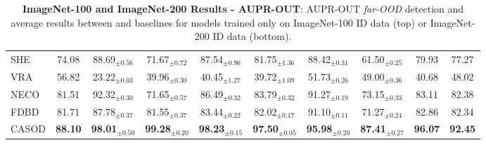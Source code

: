 \begin{table}[t!]
{\begin{tabular}{|l|c|cccccc|c|c|}
SHE    & 74.08 & 88.69$_{\pm 0.56}$ & 71.67$_{\pm 0.72}$ & 87.54$_{\pm 0.96}$ & 81.75$_{\pm 1.36}$ & 88.42$_{\pm 0.31}$ & 61.50$_{\pm 0.25}$ & 79.93 & 77.27 \\
VRA    &  56.82 & 23.22$_{\pm 0.03}$ & 39.96$_{\pm 0.30}$ & 40.45$_{\pm 1.27}$ & 39.72$_{\pm 1.09}$ & 51.73$_{\pm 0.26}$ & 49.00$_{\pm 0.36}$ & 40.68 & 48.02 \\
NECO   & 81.51 & 92.32$_{\pm 0.30}$ & 71.65$_{\pm 0.57}$ & 86.49$_{\pm 0.32}$ & 83.79$_{\pm 0.32}$ & 91.27$_{\pm 0.19}$ & 73.15$_{\pm 0.33}$ & 83.11 & 82.38 \\
FDBD   &  81.71 & 87.78$_{\pm 0.37}$ & 81.55$_{\pm 0.37}$ & 83.44$_{\pm 0.22}$ & 82.02$_{\pm 0.17}$ & 91.10$_{\pm 0.11}$ & 71.27$_{\pm 0.24}$ & 82.86 & 82.34 \\ \hline
CASOD  & \textbf{88.10} & \textbf{98.01}$_{\pm 0.50}$ & \textbf{99.28}$_{\pm 0.20}$ & \textbf{98.23}$_{\pm 0.15}$ & \textbf{97.50}$_{\pm 0.05}$ & \textbf{95.98}$_{\pm 0.20}$ & \textbf{87.41}$_{\pm 0.27}$ & \textbf{96.07} & \textbf{92.45} \\ \hline
		\end{tabular}
	}
	\caption{\textbf{ImageNet-100 and ImageNet-200 Results - AUPR-OUT}: AUPR-OUT \textit{far-OOD} detection and average results between \sys and baselines for models trained only on ImageNet-100 ID data (top) or ImageNet-200 ID data (bottom).
	}
	\label{tab:table_ood_auprout_f}
\end{table}

